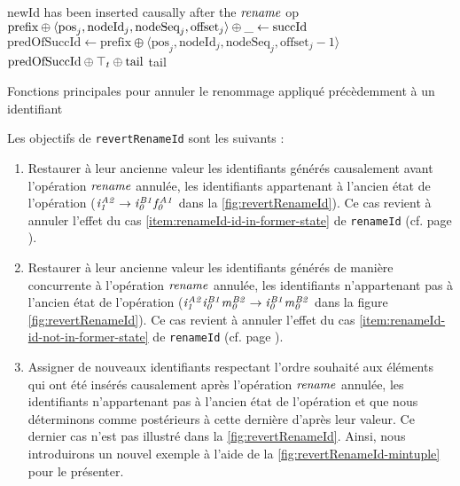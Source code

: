 \begin{algorithm}[!ht]
\begin{algorithmic}[1]
            \Statex \Comment newId has been inserted causally after the $\mathit{rename}$ op
            \State $\text{prefix} \oplus \langle \text{pos}_{j},\text{nodeId}_{j},\text{nodeSeq}_{j},\text{offset}_{j} \rangle \oplus \_ \leftarrow \text{succId}$
            \State $\text{predOfSuccId} \gets \text{prefix} \oplus \langle \text{pos}_j,\text{nodeId}_j,\text{nodeSeq}_j,\text{offset}_{j} - 1 \rangle$
            \State \Return $\text{predOfSuccId} \oplus \top_t \oplus \text{tail}$ \Comment \commenttopt
        \Else
            \State \Return tail \label{alg:revertRenameId-case-ii}
        \EndIf
    \EndFunction
  \end{algorithmic}
  \caption{Fonctions principales pour annuler le renommage appliqué précèdemment à un identifiant}
  \label{alg:revertRenameId}
\end{algorithm}

Les objectifs de \texttt{revertRenameId} sont les suivants :
\begin{enumerate}
  \item \label{item:revert-rename-1}
    Restaurer à leur ancienne valeur les identifiants générés causalement avant l'opération $\mathit{rename}$ annulée, \ie les identifiants appartenant à l'ancien état de l'opération (\eg $\mathit{i}^{\mathit{A2}}_{\mathit{1}} \rightarrow \mathit{i}^{\mathit{B1}}_{\mathit{0}}\mathit{f}^{\mathit{A1}}_{\mathit{0}}$ dans la \autoref{fig:revertRenameId}).
    Ce cas revient à annuler l'effet du cas \ref{item:renameId-id-in-former-state} de \texttt{renameId} (cf. page \pageref{item:renameId-id-in-former-state}).
  \item \label{item:revert-rename-2}
    Restaurer à leur ancienne valeur les identifiants générés de manière concurrente à l'opération $\mathit{rename}$ annulée, \ie les identifiants n'appartenant pas à l'ancien état de l'opération (\eg $\mathit{i}^{\mathit{A2}}_{\mathit{1}}\mathit{i}^{\mathit{B1}}_{\mathit{0}}\mathit{m}^{\mathit{B2}}_{\mathit{0}} \rightarrow \mathit{i}^{\mathit{B1}}_{\mathit{0}}\mathit{m}^{\mathit{B2}}_{\mathit{0}}$ dans la figure \autoref{fig:revertRenameId}).
    Ce cas revient à annuler l'effet du cas \ref{item:renameId-id-not-in-former-state} de \texttt{renameId} (cf. page \pageref{item:renameId-id-in-former-state}).
  \item \label{item:revert-rename-3}
    Assigner de nouveaux identifiants respectant l'ordre souhaité aux éléments qui ont été insérés causalement après l'opération $\mathit{rename}$ annulée, \ie les identifiants n'appartenant pas à l'ancien état de l'opération et que nous déterminons comme postérieurs à cette dernière d'après leur valeur.
    Ce dernier cas n'est pas illustré dans la \autoref{fig:revertRenameId}.
    Ainsi, nous introduirons un nouvel exemple à l'aide de la \autoref{fig:revertRenameId-mintuple} pour le présenter.
\end{enumerate}

